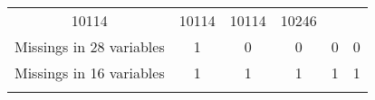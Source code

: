 \documentclass[]{book}
\begin{document}
\begin{longtable}[]{@{}cccccc@{}}
\begin{minipage}[t]{0.09\columnwidth}
10114\strut
\end{minipage} & \begin{minipage}[t]{0.09\columnwidth}\centering\strut
10114\strut
\end{minipage} & \begin{minipage}[t]{0.09\columnwidth}\centering\strut
10114\strut
\end{minipage} & \begin{minipage}[t]{0.14\columnwidth}\centering\strut
10246\strut
\end{minipage}\tabularnewline
\begin{minipage}[t]{0.28\columnwidth}\centering\strut
Missings in 28 variables\strut
\end{minipage} & \begin{minipage}[t]{0.14\columnwidth}\centering\strut
1\strut
\end{minipage} & \begin{minipage}[t]{0.09\columnwidth}\centering\strut
0\strut
\end{minipage} & \begin{minipage}[t]{0.09\columnwidth}\centering\strut
0\strut
\end{minipage} & \begin{minipage}[t]{0.09\columnwidth}\centering\strut
0\strut
\end{minipage} & \begin{minipage}[t]{0.14\columnwidth}\centering\strut
0\strut
\end{minipage}\tabularnewline
\begin{minipage}[t]{0.28\columnwidth}\centering\strut
Missings in 16 variables\strut
\end{minipage} & \begin{minipage}[t]{0.14\columnwidth}\centering\strut
1\strut
\end{minipage} & \begin{minipage}[t]{0.09\columnwidth}\centering\strut
1\strut
\end{minipage} & \begin{minipage}[t]{0.09\columnwidth}\centering\strut
1\strut
\end{minipage} & \begin{minipage}[t]{0.09\columnwidth}\centering\strut
1\strut
\end{minipage} & \begin{minipage}[t]{0.14\columnwidth}\centering\strut
1\strut
\end{minipage}\tabularnewline
\begin{minipage}[t]{0.28\columnwidth}\centering\strut

\end{minipage}
\end{longtable}
\end{document}
